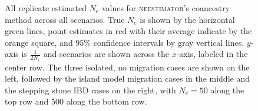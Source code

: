 \begin{landscape}
\begin{figure}[ht]
\centering
{}
\caption[All replicate estimated $N_e$ values for \textsc{neestimator}'s coancestry method across all scenarios.]{All replicate estimated $N_e$ values for \textsc{neestimator}'s coancestry method across all scenarios. True $N_e$ is shown by the horizontal green lines, point estimates in red with their average indicate by the orange square, and $95\%$ confidence intervals by gray vertical lines. $y$-axis is $\frac{1}{2 N_e}$ and scenarios are shown across the $x$-axis, labeled in the center row. The three isolated, no migration cases are shown on the left, followed by the island model migration cases in the middle and the stepping stone IBD cases on the right, with $N_e = 50$ along the top row and 500 along the bottom row.}
\label{fig:supp_coan}
\end{figure}



\end{landscape}
